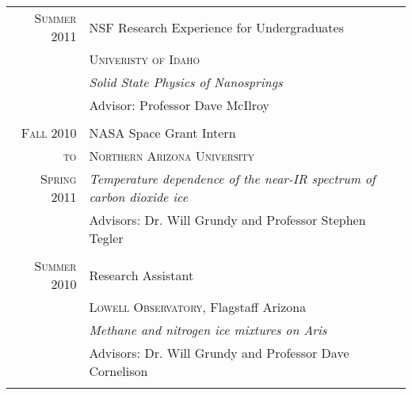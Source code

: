 \documentclass[letterpaper,10pt]{article} %
\begin{document}
\begin{tabularx}{\textwidth}{r|p{11cm}}

\textsc{Summer 2011} & NSF Research Experience for Undergraduates \\
& \textsc{Univeristy of Idaho} \\
&\emph{Solid State Physics of Nanosprings}\\ 
& Advisor: Professor Dave McIlroy \\

\multicolumn{2}{c}{} \\


\textsc{Fall 2010} & NASA Space Grant Intern\\
\textsc{to} & \textsc{Northern Arizona University} \\
\textsc{Spring 2011} &\emph{Temperature dependence of the near-IR spectrum of carbon dioxide ice}\\ 
& Advisors: Dr. Will Grundy and Professor Stephen Tegler \\

\multicolumn{2}{c}{} \\


\textsc{Summer 2010} & Research Assistant \\
& \textsc{Lowell Observatory}, Flagstaff Arizona \\
&\emph{Methane and nitrogen ice mixtures on Aris}\\ 
& Advisors: Dr. Will Grundy and Professor Dave Cornelison \\

\multicolumn{2}{c}{} \\


\end{tabularx}
\end{document}
